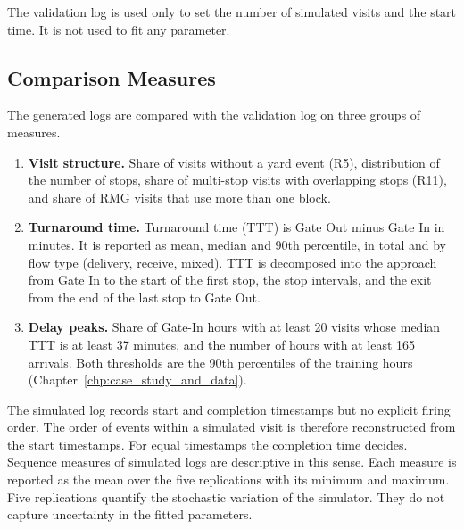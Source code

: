 The validation log is used only to set the number of simulated visits
and the start time. It is not used to fit any parameter.

\subsection{Comparison Measures}
\label{sec:exp_e3_measures}

The generated logs are compared with the validation log on three
groups of measures.

\begin{enumerate}
\item \textbf{Visit structure.} Share of visits without a yard event
(R5), distribution of the number of stops, share of multi-stop visits
with overlapping stops (R11), and share of RMG visits that use more than
one block.
\item \textbf{Turnaround time.} Turnaround time (TTT) is Gate Out minus
Gate In in minutes. It is reported as mean, median and 90th percentile,
in total and by flow type (delivery, receive, mixed). TTT is decomposed
into the approach from Gate In to the start of the first stop, the stop
intervals, and the exit from the end of the last stop to Gate Out.
\item \textbf{Delay peaks.} Share of Gate-In hours with at least 20
visits whose median TTT is at least 37 minutes, and the number of hours
with at least 165 arrivals. Both thresholds are the 90th percentiles of
the training hours (Chapter~\ref{chp:case_study_and_data}).
\end{enumerate}

The simulated log records start and completion timestamps but no
explicit firing order. The order of events within a simulated visit is
therefore reconstructed from the start timestamps. For equal timestamps
the completion time decides. Sequence measures of simulated logs are
descriptive in this sense. Each measure is reported as the mean over the
five replications with its minimum and maximum. Five replications
quantify the stochastic variation of the simulator. They do not capture
uncertainty in the fitted parameters.
